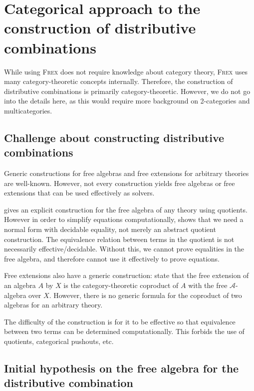 \section{Categorical approach to the construction of distributive combinations}
\label{sec:construction}


While using \textsc{Frex} does not require knowledge about category theory, \textsc{Frex} uses many category-theoretic concepts internally. Therefore, the construction of distributive combinations is primarily category-theoretic. However, we do not go into the details here, as this would require more background on 2-categories and multicategories.

\subsection{Challenge about constructing distributive combinations}
\label{sec:challenge}

Generic constructions for free algebras and free extensions for arbitrary theories are well-known. However, not every construction yields free algebras or free extensions that can be used effectively as solvers.


 gives an explicit construction for the free algebra of any theory using quotients. However in order to simplify equations computationally,  shows that we need a normal form with decidable equality, not merely an abstract quotient construction. The equivalence relation between terms in the quotient is not necessarily effective/decidable. Without this, we cannot prove equalities in the free algebra, and therefore cannot use it effectively to prove equations.


Free extensions also have a generic construction: \textcite{frex_origin,idris_frex} state that the free extension of an algebra $A$ by $X$ is the category-theoretic coproduct of $A$ with the free $\mathcal{A}$-algebra over $X$. However, there is no generic formula for the coproduct of two algebras for an arbitrary theory.

The difficulty of the construction is for it to be effective so that equivalence between two terms can be determined computationally. This forbids the use of quotients, categorical pushouts, etc.

\subsection{Initial hypothesis on the free algebra for the distributive combination}
\label{sec:initial_result}

